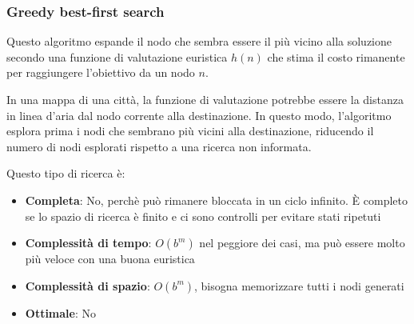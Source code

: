 \documentclass[a4paper]{article}
\begin{document}
\subsubsection{Greedy best-first search}
Questo algoritmo espande il nodo che sembra essere il più vicino alla soluzione
secondo una funzione di valutazione euristica \( h(n) \) che stima il costo
rimanente per raggiungere l'obiettivo da un nodo \( n \).
\begin{example}
  In una mappa di una città, la funzione di valutazione potrebbe essere la distanza
  in linea d'aria dal nodo corrente alla destinazione. In questo modo, l'algoritmo
  esplora prima i nodi che sembrano più vicini alla destinazione, riducendo il numero
  di nodi esplorati rispetto a una ricerca non informata.
\end{example}
Questo tipo di ricerca è:
\begin{itemize}
  \item \textbf{Completa}: No, perchè può rimanere bloccata in un ciclo infinito. È
    completo se lo spazio di ricerca è finito e ci sono controlli per evitare stati
    ripetuti
  \item \textbf{Complessità di tempo}: \( O(b^m) \) nel peggiore dei casi, ma può essere
    molto più veloce con una buona euristica
  \item \textbf{Complessità di spazio}: \( O(b^m) \), bisogna memorizzare tutti i nodi
    generati
  \item \textbf{Ottimale}: No
\end{itemize}
\end{document}
